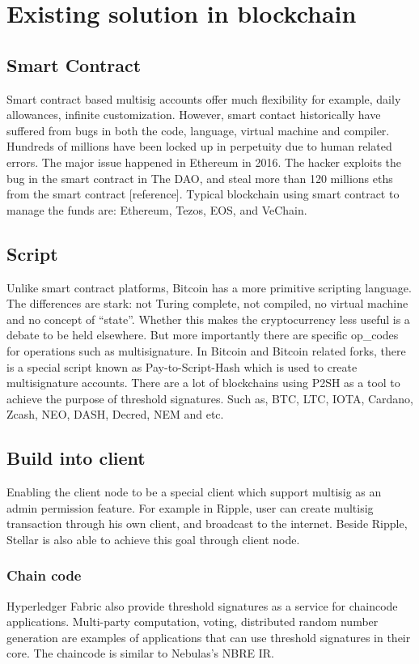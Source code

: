 \section{Existing solution in blockchain}
\label{sec:sigblockchain}

\subsection{Smart Contract}
\label{smartcontract}

Smart contract based multisig accounts offer much flexibility for example, daily allowances, infinite customization. However, smart contact historically have suffered from bugs in both the code, language, virtual machine and compiler. Hundreds of millions have been locked up in perpetuity due to human related errors. The major issue happened in Ethereum in 2016. The hacker exploits the bug in the smart contract in The DAO, and steal more than 120 millions eths from the smart contract [reference]. Typical blockchain using smart contract to manage the funds are: Ethereum, Tezos, EOS, and VeChain.


\subsection{Script}
\label{script}

Unlike smart contract platforms, Bitcoin has a more primitive scripting language. The differences are stark: not Turing complete, not compiled, no virtual machine and no concept of “state”. Whether this makes the cryptocurrency less useful is a debate to be held elsewhere. But more importantly there are specific op_codes for operations such as multisignature. In Bitcoin and Bitcoin related forks, there is a special script known as Pay-to-Script-Hash which is used to create multisignature accounts. There are a lot of blockchains using P2SH as a tool to achieve the purpose of threshold signatures. Such as, BTC, LTC, IOTA, Cardano, Zcash, NEO, DASH, Decred, NEM and etc.

\subsection{Build into client}
\label{client}

Enabling the client node to be a special client which support multisig as an admin permission feature. For example in Ripple, user can create multisig transaction through his own client, and broadcast to the internet. Beside Ripple, Stellar is also able to achieve this goal through client node.

\subsubsection{Chain code}
\label{chaincode}

Hyperledger Fabric also provide threshold signatures as a service  for  chaincode applications. Multi-party computation, voting, distributed random number generation are examples of applications that can use threshold signatures in their core. The chaincode is similar to Nebulas’s NBRE IR.
